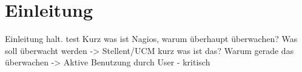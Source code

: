 \section{Einleitung}

Einleitung halt. test
Kurz was ist Nagios, warum überhaupt überwachen?
Was soll überwacht werden -> Stellent/UCM kurz was ist das? Warum gerade das überwachen -> Aktive Benutzung durch User - kritisch